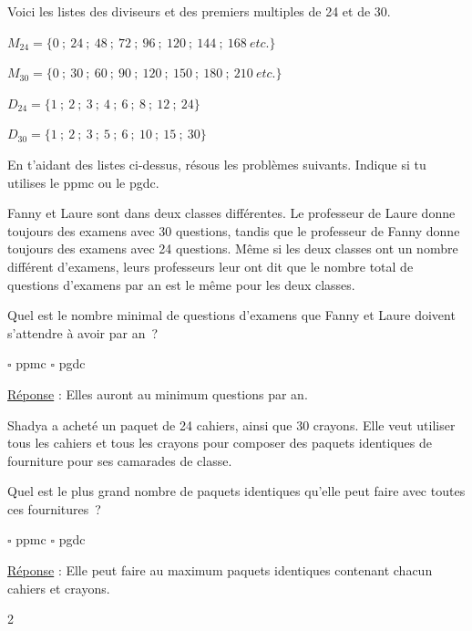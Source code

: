 \documentclass[a4paper,11pt]{report}
\begin{document}
\begin{exo}{
    Voici les listes des diviseurs et des premiers multiples de 24 et de 30. 
    
    \hspace*{1cm} $M_{24}=\{0~;~24~;~48~;~72~;~96~;~120~;~144~;~168~etc.\}$ 

    \hspace*{1cm} $M_{30}=\{0~;~30~;~60~;~90~;~120~;~150~;~180~;~210~etc.\}$

    \hspace*{1cm} $D_{24}=\{1~;~2~;~3~;~4~;~6~;~8~;~12~;~24\}$ 

    \hspace*{1cm} $D_{30}=\{1~;~2~;~3~;~5~;~6~;~10~;~15~;~30\}$ 

    En t'aidant des listes ci-dessus, résous les problèmes suivants. Indique si tu utilises le ppmc ou le pgdc. 
    
    \begin{tasks}[label-width = 1em ,item-indent = 2em ,before-skip = -0.4em, after-skip = -0.4em , label-offset=0.666em,after-item-skip = 0.3em]
        \task Fanny et Laure sont dans deux classes différentes. Le professeur de Laure donne toujours des examens avec 30 questions, tandis que le professeur de Fanny donne toujours des examens avec 24 questions. Même si les deux classes ont un nombre différent d'examens, leurs professeurs leur ont dit que le nombre total de questions d'examens par an est le même pour les deux classes.

		Quel est le nombre minimal de questions d'examens que Fanny et Laure doivent s'attendre à avoir par an~?
        \begin{center}  $\square$ ppmc \hspace*{2cm} $\square$ pgdc     \end{center}
        \underline{Réponse} : Elles auront au minimum  questions par an.
    
        \task Shadya a acheté un paquet de 24 cahiers, ainsi que 30 crayons. Elle veut utiliser tous les cahiers et tous les crayons pour composer des paquets identiques de fourniture pour ses camarades de classe. 

		Quel est le plus grand nombre de paquets identiques qu'elle peut faire avec toutes ces fournitures~?
        \begin{center}  $\square$ ppmc \hspace*{2cm} $\square$ pgdc     \end{center}
        \underline{Réponse} : Elle peut faire au maximum  paquets identiques contenant chacun  cahiers et  crayons.

    \end{tasks} 
}{2}\end{exo}
\end{document}
